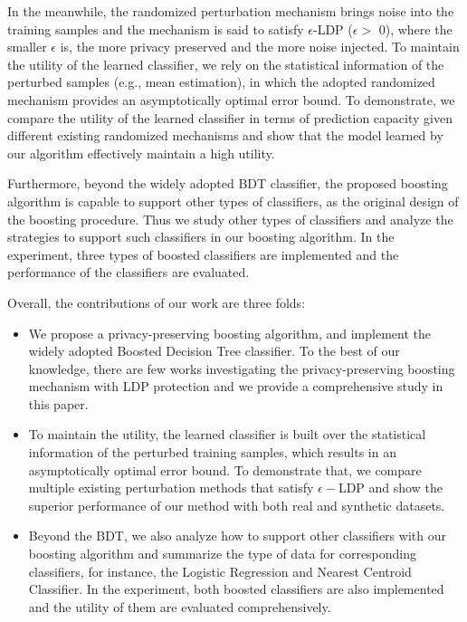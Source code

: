 \documentclass[10pt,journal,compsoc]{IEEEtran}
\begin{document}
In the meanwhile, the randomized perturbation mechanism brings noise into the training samples and the mechanism is said to satisfy $\epsilon$-LDP ($\epsilon >$ 0), where the smaller $\epsilon$ is, the more privacy preserved and the more noise injected. To maintain the utility of the learned classifier, we rely on the statistical information of the perturbed samples (e.g., mean estimation), in which the adopted randomized mechanism provides an asymptotically optimal error bound. To demonstrate, we compare the utility of the learned classifier in terms of prediction capacity given different existing  randomized mechanisms and show that the model learned by our algorithm effectively maintain a high utility.

Furthermore, beyond the widely adopted BDT classifier, the proposed boosting algorithm is capable to support other types of classifiers, as the original design of the boosting procedure. Thus we study other types of classifiers and analyze the strategies to support such classifiers in our boosting algorithm. In the experiment, three types of boosted classifiers are implemented and the performance of the classifiers are evaluated. 
  
Overall, the contributions of our work are three folds:

\begin{itemize}
\item We propose a privacy-preserving boosting algorithm, and implement the widely adopted Boosted Decision Tree classifier. To the best of our knowledge, there are few works investigating the privacy-preserving boosting mechanism with LDP protection and we provide a comprehensive study in this paper.
\item To maintain the utility, the learned classifier is built over the statistical information of the perturbed training samples, which results in an asymptotically optimal error bound. To demonstrate that, we compare multiple existing perturbation methods that satisfy $\epsilon-$LDP and show the superior performance of our method with both real and synthetic datasets.
\item Beyond the BDT, we also analyze how to support other classifiers with our boosting algorithm and summarize the type of data for corresponding classifiers, for instance, the Logistic Regression and Nearest Centroid Classifier. In the experiment, both boosted classifiers are also implemented and the utility of them are evaluated comprehensively.
\end{itemize}
\end{document}
